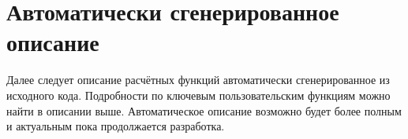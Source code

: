 \chapter{Автоматически сгенерированное описание}

Далее следует описание расчётных функций \unf{} автоматически сгенерированное из исходного кода.
Подробности по ключевым пользовательским функциям можно найти в описании выше. Автоматическое описание возможно будет более полным и актуальным пока продолжается разработка.